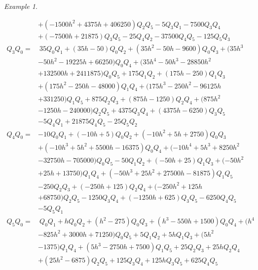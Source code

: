 \documentclass{gtpart}
\theoremstyle{definition}
\theoremstyle{remark}
\newtheorem{ex}[equation]{Example}
\renewcommand{\=}{\approx}
\renewcommand{\-}{\sim}
\numberwithin{equation}{section}
\begin{document}
\begin{ex}
\begin{itemize}
\begin{equation*}
\begin{split}
              & + (-1500 h^2 + 4375 h + 406250) Q_2 Q_5 - 5 Q_3 Q_1 - 7500 Q_3 Q_4 \\
              & + (-7500 h + 21875) Q_3 Q_5 - 25 Q_4 Q_2 - 37500 Q_4 Q_5 - 125 Q_5 Q_3 \\
    Q_3 Q_0 = & ~ 35 Q_0 Q_1 + (35 h - 50) Q_0 Q_2 + (35 h^2 - 50 h - 9600) Q_0 Q_3 + (35 h^3 \\
              & - 50 h^2 - 19225 h + 66250) Q_0 Q_4 + (35 h^4 - 50 h^3 - 28850 h^2 \\
              & + 132500 h + 2411875) Q_0 Q_5 + 175 Q_1 Q_2 + (175 h - 250) Q_1 Q_3 \\
              & + (175 h^2 - 250 h - 48000) Q_1 Q_4 + (175 h^3 - 250 h^2 - 96125 h \\
              & + 331250) Q_1 Q_5 + 875 Q_2 Q_3 + (875 h - 1250) Q_2 Q_4 + (875 h^2 \\
              & - 1250 h - 240000) Q_2 Q_5 + 4375 Q_3 Q_4 + (4375 h - 6250) Q_3 Q_5 \\
              & - 5 Q_4 Q_1 + 21875 Q_4 Q_5 - 25 Q_5 Q_2 \\
    Q_4 Q_0 = & -10 Q_0 Q_1 + (-10 h + 5) Q_0 Q_2 + (-10 h^2 + 5 h + 2750) Q_0 Q_3 \\
              & + (-10 h^3 + 5 h^2 + 5500 h - 16375) Q_0 Q_4 + (-10 h^4 + 5 h^3 + 8250 h^2 \\
              & - 32750 h - 705000) Q_0 Q_5 - 50 Q_1 Q_2 + (-50 h + 25) Q_1 Q_3 + (-50 h^2 \\
              & + 25 h + 13750) Q_1 Q_4 + (-50 h^3 + 25 h^2 + 27500 h - 81875) Q_1 Q_5 \\
              & - 250 Q_2 Q_3 + (-250 h + 125) Q_2 Q_4 + (-250 h^2 + 125 h \\
              & + 68750) Q_2 Q_5 - 1250 Q_3 Q_4 + (-1250 h + 625) Q_3 Q_5 - 6250 Q_4 Q_5 \\
              & - 5 Q_5 Q_1 \\
    Q_5 Q_0 = & ~ Q_0 Q_1 + h Q_0 Q_2 + (h^2 - 275) Q_0 Q_3 + (h^3 - 550 h + 1500) Q_0 Q_4 + (h^4 \\
              & - 825 h^2 + 3000 h + 71250) Q_0 Q_5 + 5 Q_1 Q_2 + 5 h Q_1 Q_3 + (5 h^2 \\
              & - 1375) Q_1 Q_4 + (5 h^3 - 2750 h + 7500) Q_1 Q_5 + 25 Q_2 Q_3 + 25 h Q_2 Q_4\\
              & + (25 h^2 - 6875) Q_2 Q_5 + 125 Q_3 Q_4 + 125 h Q_3 Q_5 + 625 Q_4 Q_5 
   \end{split}
  \end{equation*}


\end{itemize}
\end{ex}
\end{document}
